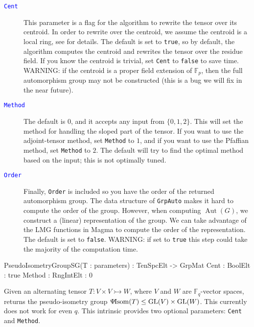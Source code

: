 \documentclass{documentation}
\DeclareMathOperator{\Aut}{Aut}
\DeclareMathOperator{\isom}{Isom}
\DeclareMathOperator{\GL}{{\rm GL}}
\newcommand{\pseudo}{\Psi\hspace*{-1mm}\isom}
\begin{document}
\begin{description}
\item[\textcolor{blue}{\tt Cent}]
This parameter is a flag for the algorithm to rewrite the tensor over its centroid. 
In order to rewrite over the centroid, we assume the centroid is a local ring, see \cite{eMAGma} for details.
The default is set to {\tt true}, so by default, the algorithm computes the centroid and rewrites the tensor over the residue field.
If you know the centroid is trivial, set {\tt Cent} to {\tt false} to save time.
WARNING: if the centroid is a proper field extension of $\mathbb{F}_p$, then the full automorphism group may not be constructed (this is a bug we will fix in the near future).
\item[\textcolor{blue}{\tt Method}]
The default is $0$, and it accepts any input from $\{ 0,1,2\}$. 
This will set the method for handling the sloped part of the tensor.
If you want to use the adjoint-tensor method, set {\tt Method} to $1$, and if you want to use the Pfaffian method, set {\tt Method} to $2$. The default will try to find the optimal method based on the input; this is not optimally tuned.
\item[\textcolor{blue}{\tt Order}]
Finally, {\tt Order} is included so you have the order of the returned automorphism group. 
The data structure of {\tt GrpAuto} makes it hard to compute the order of the group. 
However, when computing $\Aut(G)$, we construct a (linear) representation of the group. 
We can take advantage of the LMG functions \cite{LMG} in Magma to compute the order of the representation. 
The default is set to {\tt false}. 
WARNING: if set to {\tt true} this step could take the majority of the computation time.
\end{description}

\begin{intrinsics}
PseudoIsometryGroupSG(T : parameters) : TenSpcElt -> GrpMat
    Cent : BoolElt : true
    Method : RngIntElt : 0
\end{intrinsics}

Given an alternating tensor $T : V \times V \rightarrowtail W$, where $V$ and $W$ are $\mathbb{F}_q$-vector spaces, returns the pseudo-isometry group $\pseudo(T)\leq \GL(V)\times \GL(W)$.
This currently does not work for even $q$. 
This intrinsic provides two optional parameters: {\tt Cent} and {\tt Method}. 
\end{document}
